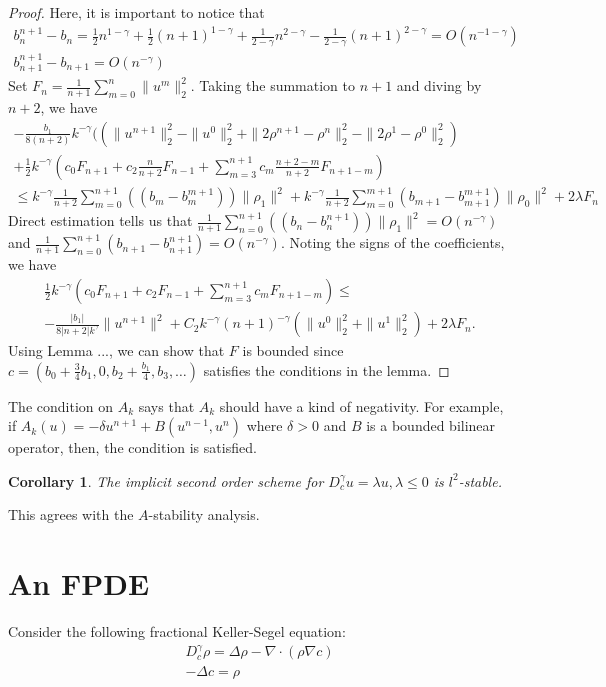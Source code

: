 \documentclass[11pt]{article}
\newtheorem{cor}{Corollary}
\begin{document}
\begin{proof}
Here, it is important to notice that 
\begin{gather*}
b_n^{n+1}-b_n=\frac{1}{2}n^{1-\gamma}+\frac{1}{2}(n+1)^{1-\gamma}
+\frac{1}{2-\gamma}n^{2-\gamma}
-\frac{1}{2-\gamma}(n+1)^{2-\gamma}=O(n^{-1-\gamma})\\
b_{n+1}^{n+1}-b_{n+1}=O(n^{-\gamma})
\end{gather*}
Set $F_n=\frac{1}{n+1}\sum_{m=0}^n\|u^m\|_2^2$.
Taking the summation to $n+1$ and diving by $n+2$, we have
\begin{multline*}
-\frac{b_1}{8(n+2)}k^{-\gamma}((\|u^{n+1}\|_2^2-\|u^0\|_2^2+\|2\rho^{n+1}-\rho^n\|_2^2-\|2\rho^1-\rho^{0}\|_2^2)\\
+\frac{1}{2}k^{-\gamma}\left(c_0F_{n+1}
+c_2\frac{n}{n+2}F_{n-1}
+\sum_{m=3}^{n+1}c_m\frac{n+2-m}{n+2}F_{n+1-m}\right)\\
\le k^{-\gamma}\frac{1}{n+2}\sum_{m=0}^{n+1}((b_{m}-b^{m+1}_m))\|\rho_1\|^2
+k^{-\gamma}\frac{1}{n+2}\sum_{m=0}^{m+1}(b_{m+1}-b_{m+1}^{m+1})\|\rho_0\|^2
+2\lambda F_n
\end{multline*}
Direct estimation tells us that $\frac{1}{n+1}\sum_{n=0}^{n+1}((b_{n}-b^{n+1}_n))\|\rho_1\|^2=O(n^{-\gamma})$ and $\frac{1}{n+1}\sum_{n=0}^{n+1}(b_{n+1}-b_{n+1}^{n+1})=O(n^{-\gamma})$.
Noting the signs of the coefficients, we have
\begin{multline*}
\frac{1}{2}k^{-\gamma}\left(c_0F_{n+1}+c_2F_{n-1}
+\sum_{m=3}^{n+1}c_mF_{n+1-m}\right)\le \\
-\frac{|b_1|}{8|n+2|k^{\gamma}}\|u^{n+1}\|^2+
C_2k^{-\gamma}(n+1)^{-\gamma}(\|u^0\|_2^2+\|u^1\|_2^2)+2\lambda F_n.
\end{multline*}
Using Lemma ..., we can show that $F$ is bounded since $c=(b_0+\frac{3}{4}b_1,0, b_2+\frac{b_1}{4}, b_3,\ldots)$ satisfies the conditions in the lemma.
\end{proof}
The condition on $A_k$ says that $A_k$ should have a kind of negativity. For example, if $A_k(u)=-\delta u^{n+1}+B(u^{n-1}, u^n)$ where $\delta>0$ and $B$ is a bounded bilinear operator, then, the condition is satisfied. 

\begin{cor}
The implicit second order scheme for $D_c^{\gamma}u=\lambda u, \lambda\le 0$ is $l^2$-stable.
\end{cor}
This agrees with the $A$-stability analysis.


\section{An FPDE}
Consider the following fractional Keller-Segel equation:
\begin{gather*}
D_c^{\gamma}\rho=\Delta\rho-\nabla\cdot(\rho\nabla c)\\
-\Delta c=\rho
\end{gather*}
\end{document}
